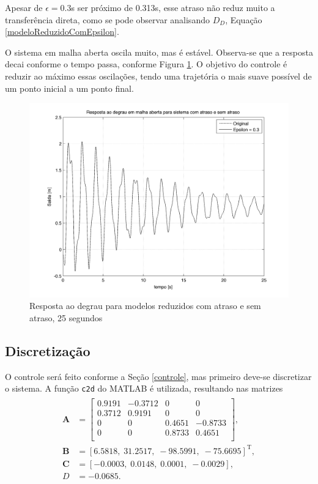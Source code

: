 Apesar de $\epsilon=0.3$s ser próximo de 0.313s, esse atraso não reduz muito a transferência direta, como se pode observar analisando $D_D$, Equação \ref{modeloReduzidoComEpsilon}.



 O sistema em malha aberta oscila muito, mas é estável. Observa-se que a resposta decai conforme o tempo passa, conforme Figura \ref{modeloMalhaAberta25s}. O objetivo do controle é reduzir ao máximo essas oscilações, tendo uma trajetória o mais suave possível de um ponto inicial a um ponto final. 
\begin{figure}[!ht]
\centering

\includegraphics[width=0.8\linewidth]{figs/resultados/modelo/respostaMalhaAberta25s}
\caption{Resposta ao degrau para modelos reduzidos com atraso e sem atraso, 25 segundos\label{modeloMalhaAberta25s}}
\end{figure}

\subsection{Discretização}
 O controle será feito conforme a Seção \ref{controle}, mas primeiro deve-se discretizar o sistema.  A função \texttt{c2d} \cite{c2d} do MATLAB é utilizada, resultando nas matrizes \begin{align}
 \begin{array}{ll}
 	\mathbf{A} &= \left[\begin{array}{cccc}
	0.9191&   -0.3712&         0&         0\\
    0.3712&    0.9191&         0&         0\\
         0&         0&    0.4651&   -0.8733\\
         0&         0&    0.8733&    0.4651\\
 \end{array}\right],\\
 	\mathbf{B} &= \left[6.5818,\;
   31.2517,\;
  -98.5991,\;
  -75.6695\right]^{\mathrm{T}},\\
   \mathbf{C} &= \left[-0.0003,\;0.0148,\;0.0001,\;-0.0029\right],\\
   D &= -0.0685.
 \end{array}
 \end{align}
 
